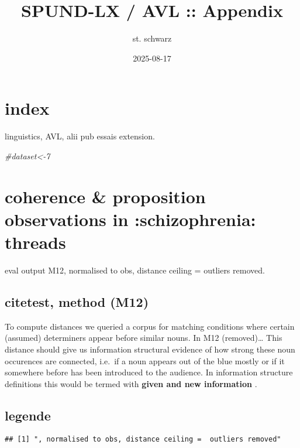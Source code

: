 \documentclass[
]{article}
\title{SPUND-LX / AVL :: Appendix}
\author{st. schwarz}
\date{2025-08-17}
\newenvironment{Shaded}{\begin{snugshade}}{\end{snugshade}}
\newcommand{\CommentTok}[1]{\textcolor[rgb]{0.56,0.35,0.01}{\textit{#1}}}
\begin{document}
\maketitle

{
\setcounter{tocdepth}{2}
\tableofcontents
}
\section{index}\label{index}

linguistics, AVL, alii pub essais extension.

\begin{Shaded}
\begin{Highlighting}[]
\CommentTok{\#dataset\textless{}{-}7}
\end{Highlighting}
\end{Shaded}

\section{coherence \& proposition observations in :schizophrenia: threads}\label{coherence-proposition-observations-in-schizophrenia-threads}

eval output M12, normalised to obs, distance ceiling = outliers removed.

\subsection{citetest, method (M12)}\label{citetest-method-m12}

To compute distances we queried a corpus for matching conditions where certain (assumed) determiners appear before similar nouns. In M12 (removed)\ldots{} This distance should give us information structural evidence of how strong these noun occurences are connected, i.e.~if a noun appears out of the blue mostly or if it somewhere before has been introduced to the audience. In information structure definitions this would be termed with \textbf{given and new information} \citep{prince_toward_1981}.

\subsection{legende}\label{legende}

\begin{verbatim}
## [1] ", normalised to obs, distance ceiling =  outliers removed"
\end{verbatim}
\end{document}
